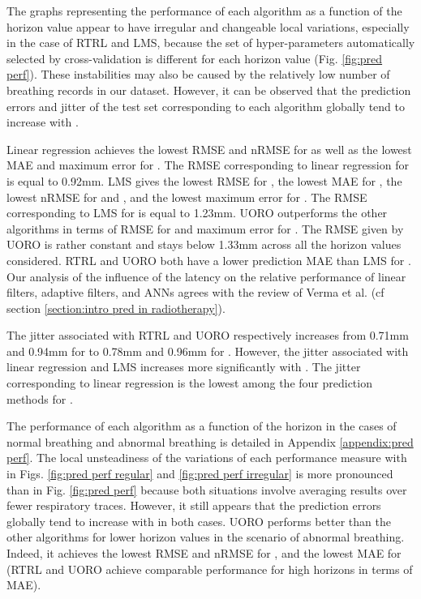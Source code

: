\documentclass[twocolumn,a4paper]{svjour3} \sloppy          \smartqed
\begin{document}
The graphs representing the performance of each algorithm as a function of the horizon value  appear to have irregular and changeable local variations, especially in the case of RTRL and LMS, because the set of hyper-parameters automatically selected by cross-validation is different for each horizon value (Fig. \ref{fig:pred perf}). These instabilities may also be caused by the relatively low number of breathing records in our dataset. However, it can be observed that the prediction errors and jitter of the test set corresponding to each algorithm globally tend to increase with . 

Linear regression achieves the lowest RMSE and nRMSE for  as well as the lowest MAE and maximum error for . The RMSE corresponding to linear regression for  is equal to 0.92mm. LMS gives the lowest RMSE for , the lowest MAE for , the lowest nRMSE for  and , and the lowest maximum error for . The RMSE corresponding to LMS for  is equal to 1.23mm. UORO outperforms the other algorithms in terms of RMSE for  and maximum error for . The RMSE given by UORO is rather constant and stays below 1.33mm across all the horizon values considered. RTRL and UORO both have a lower prediction MAE than LMS for . Our analysis of the influence of the latency on the relative performance of linear filters, adaptive filters, and ANNs agrees with the review of Verma et al. \cite{verma2010survey} (cf section \ref{section:intro pred in radiotherapy}).

The jitter associated with RTRL and UORO respectively increases from 0.71mm and 0.94mm for  to 0.78mm and 0.96mm for . However, the jitter associated with linear regression and LMS increases more significantly with . The jitter corresponding to linear regression is the lowest among the four prediction methods for .

The performance of each algorithm as a function of the horizon in the cases of normal breathing and abnormal breathing is detailed in Appendix \ref{appendix:pred perf}. The local unsteadiness of the variations of each performance measure with  in Figs. \ref{fig:pred perf regular} and \ref{fig:pred perf irregular} is more pronounced than in Fig. \ref{fig:pred perf} because both situations involve averaging results over fewer respiratory traces. However, it still appears that the prediction errors globally tend to increase with  in both cases. UORO performs better than the other algorithms for lower horizon values in the scenario of abnormal breathing. Indeed, it achieves the lowest RMSE and nRMSE for , and the lowest MAE for  (RTRL and UORO achieve comparable performance for high horizons in terms of MAE).
\end{document}

